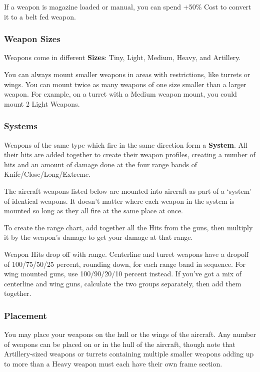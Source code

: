 \documentclass{article}
\begin{document}
If a weapon is magazine loaded or manual, you can spend +50\% Cost to
convert it to a belt fed weapon.

\subsubsection{Weapon Sizes}
\label{_Weapon Sizes}

Weapons come in different \textbf{Sizes}: Tiny, Light, Medium, Heavy,
and Artillery.

You can always mount smaller weapons in areas with restrictions, like
turrets or wings. You can mount twice as many weapons of one size
smaller than a larger weapon. For example, on a turret with a Medium
weapon mount, you could mount 2 Light Weapons.

\subsubsection{Systems}
\label{_Systems}

Weapons of the same type which fire in the same direction form a
\textbf{System}. All their hits are added together to create their
weapon profiles, creating a number of hits and an amount of damage done
at the four range bands of Knife/Close/Long/Extreme.

The aircraft weapons listed below are mounted into aircraft as part of a
`system' of identical weapons. It doesn't matter where each weapon in
the system is mounted so long as they all fire at the same place at
once.

To create the range chart, add together all the Hits from the guns, then
multiply it by the weapon's damage to get your damage at that range.

Weapon Hits drop off with range. Centerline and turret weapons have a
dropoff of 100/75/50/25 percent, rounding down, for each range band in
sequence. For wing mounted guns, use 100/90/20/10 percent instead. If
you've got a mix of centerline and wing guns, calculate the two groups
separately, then add them together.

\subsubsection{Placement}
\label{_Placement}

You may place your weapons on the hull or the wings of the aircraft. Any
number of weapons can be placed on or in the hull of the aircraft,
though note that Artillery-sized weapons or turrets containing multiple
smaller weapons adding up to more than a Heavy weapon must each have
their own frame section.
\end{document}
